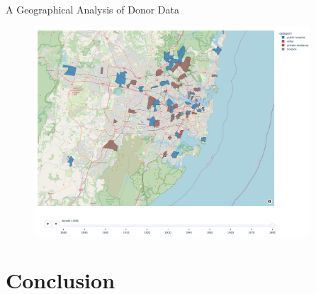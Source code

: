 \documentclass[]{beamer}
\begin{document}
\begin{frame}{A Geographical Analysis of Donor Data}
	\begin{figure}
		\includegraphics[width=0.92\textwidth]{img/choropleth_time/choropleth-11.png}
	\end{figure}
\end{frame}


	\section{Conclusion}
\end{document}
